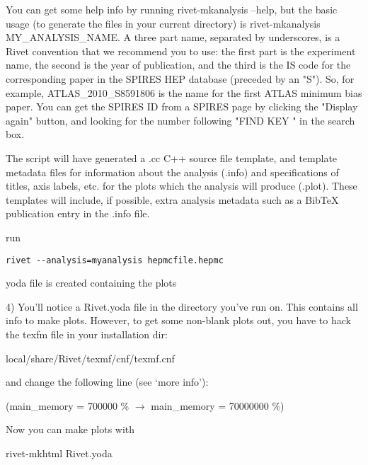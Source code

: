 You can get some help info by running rivet-mkanalysis --help, but the basic usage (to generate the files in your current directory) is rivet-mkanalysis MY\_ANALYSIS\_NAME. A three part name, separated by underscores, is a Rivet convention that we recommend you to use: the first part is the experiment name, the second is the year of publication, and the third is the IS code for the corresponding paper in the SPIRES HEP database (preceded by an "S"). So, for example, ATLAS\_2010\_S8591806 is the name for the first ATLAS minimum bias paper. You can get the SPIRES ID from a SPIRES page by clicking the "Display again" button, and looking for the number following "FIND KEY " in the search box.

The script will have generated a .cc C++ source file template, and template metadata files for information about the analysis (.info) and specifications of titles, axis labels, etc. for the plots which the analysis will produce (.plot). These templates will include, if possible, extra analysis metadata such as a BibTeX publication entry in the .info file.

run

\lstinline|rivet --analysis=myanalysis hepmcfile.hepmc|

yoda file is created containing the plots

4) You’ll notice a Rivet.yoda file in the directory you’ve run on. This contains all info to make plots. However, to get some non-blank plots out, you have to hack the texfm file in your installation dir:


local/share/Rivet/texmf/cnf/texmf.cnf


and change the following line (see ‘more info’):


(main\_memory = 700000 \%  $\rightarrow$ main\_memory = 70000000 \%)


Now you can make plots with


rivet-mkhtml Rivet.yoda